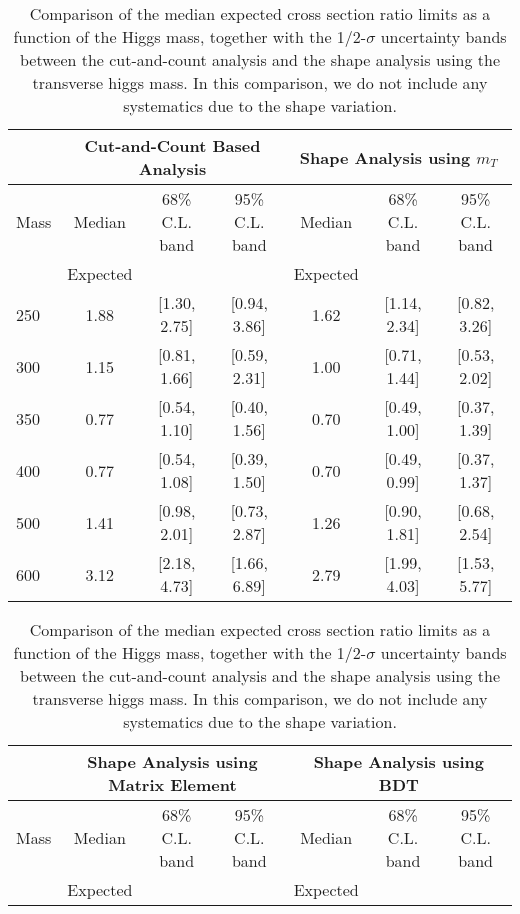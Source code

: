 \begin{table}[!ht]
\begin{center}
{\normalsize
\begin{tabular}{|l|c|c|c|c|c|c|}
\hline
      &  \multicolumn{3}{c|}{Cut-and-Count Based Analysis} &\multicolumn{3}{c|}{Shape Analysis using $m_T$} \\
\hline
Mass  &  Median      &     68\% C.L. band &  95\% C.L. band &  Median	   &	 68\% C.L. band &  95\% C.L. band\\
      &  Expected    &                    &                 &  Expected    &			&		 \\
\hline
250 & 1.88 & [1.30, 2.75] & [0.94, 3.86] & 1.62 & [1.14, 2.34] & [0.82, 3.26] \\ 
300 & 1.15 & [0.81, 1.66] & [0.59, 2.31] & 1.00 & [0.71, 1.44] & [0.53, 2.02] \\
350 & 0.77 & [0.54, 1.10] & [0.40, 1.56] & 0.70 & [0.49, 1.00] & [0.37, 1.39] \\
400 & 0.77 & [0.54, 1.08] & [0.39, 1.50] & 0.70 & [0.49, 0.99] & [0.37, 1.37] \\
500 & 1.41 & [0.98, 2.01] & [0.73, 2.87] & 1.26 & [0.90, 1.81] & [0.68, 2.54] \\
600 & 3.12 & [2.18, 4.73] & [1.66, 6.89] & 2.79 & [1.99, 4.03] & [1.53, 5.77] \\
\hline
\end{tabular}
}
\caption{Comparison of the median expected cross section ratio limits as a function 
of the Higgs mass, together with the 1/2-$\sigma$ uncertainty bands between the cut-and-count 
analysis and the shape analysis using the transverse higgs mass. In this comparison, we do not include any systematics due to 
the shape variation. }
\label{tab:mva_mtshapevscuts_hzz}
\end{center}
\begin{center}
{\normalsize
\begin{tabular}{|l|c|c|c|c|c|c|}
\hline
      &  \multicolumn{3}{c|}{Shape Analysis using Matrix Element} &\multicolumn{3}{c|}{Shape Analysis using BDT} \\
\hline
Mass  &  Median      &     68\% C.L. band &  95\% C.L. band &  Median	   &	 68\% C.L. band &  95\% C.L. band\\
      &  Expected    &                    &                 &  Expected    &			&		 \\

\end{tabular}}
\end{center}
\end{table}
